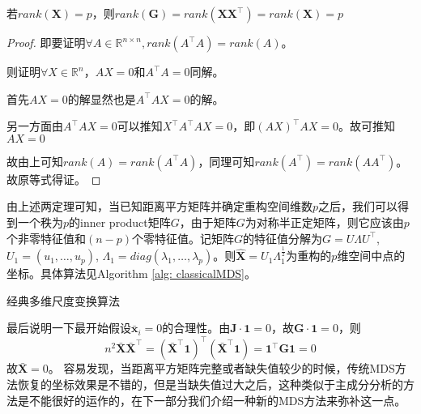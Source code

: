 \begin{theorem}
若$rank(\mathbf{X}) = p$，则$rank(\mathbf{G}) = rank(\mathbf{XX^\intercal}) = rank(\mathbf{X}) = p$
\end{theorem}
\begin{proof}
即要证明$\forall A\in \mathbb{R}^{n\times n}, rank(A^\intercal A) = rank(A)$。

则证明$\forall X\in \mathbb{R}^n$，$AX = 0$和$A^\intercal A = 0$同解。

首先$AX = 0$的解显然也是$A^\intercal AX = 0$的解。

另一方面由$A^\intercal AX = 0$可以推知$X^\intercal A^\intercal AX = 0$，即$(AX)^\intercal AX = 0$。故可推知$AX = 0$

故由上可知$rank(A) = rank(A^\intercal A)$，同理可知$rank(A^\intercal) = rank(AA^\intercal)$。故原等式得证。
\end{proof}

由上述两定理可知，当已知距离平方矩阵并确定重构空间维数$p$之后，我们可以得到一个秩为$p$的inner product矩阵$G$，由于矩阵$G$为对称半正定矩阵，则它应该由$p$个非零特征值和$(n-p)$个零特征值。记矩阵$G$的特征值分解为$G = U\Lambda U^\intercal$, $U_1 = (u_1, \dots, u_p)$, $\Lambda_1 = diag(\lambda_1, \dots, \lambda_p)$。则$\hat{\mathbf{X}} = U_1\Lambda_1^{\frac{1}{2}}$为重构的$p$维空间中点的坐标。具体算法见Algorithm \ref{alg: classicalMDS}。
\begin{algorithm}
\caption{经典多维尺度变换算法} 
\label{alg: classicalMDS}
\begin{algorithmic}[1]
\end{algorithmic}
\end{algorithm}

最后说明一下最开始假设$\bar{\mathbf{x}}_i = 0$的合理性。由$\mathbf{J\cdot1} = 0$，故$\mathbf{G\cdot1} = 0$，则
\begin{equation*}
    n^2\bar{\mathbf{X}}\bar{\mathbf{X}}^\intercal = (\bar{\mathbf{X}}^\intercal\mathbf{1})^\intercal(\bar{\mathbf{X}}^\intercal\mathbf{1}) = \mathbf{1}^\intercal\mathbf{G1} = 0
\end{equation*}
故$\bar{\mathbf{X}} = 0$。
容易发现，当距离平方矩阵完整或者缺失值较少的时候，传统MDS方法恢复的坐标效果是不错的，但是当缺失值过大之后，这种类似于主成分分析的方法是不能很好的运作的，在下一部分我们介绍一种新的MDS方法来弥补这一点。
